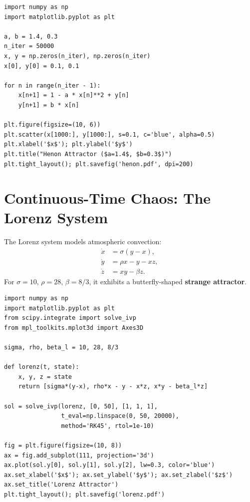 \begin{codeblock}[title=\textbf{H\'enon attractor}]
\begin{verbatim}
import numpy as np
import matplotlib.pyplot as plt

a, b = 1.4, 0.3
n_iter = 50000
x, y = np.zeros(n_iter), np.zeros(n_iter)
x[0], y[0] = 0.1, 0.1

for n in range(n_iter - 1):
    x[n+1] = 1 - a * x[n]**2 + y[n]
    y[n+1] = b * x[n]

plt.figure(figsize=(10, 6))
plt.scatter(x[1000:], y[1000:], s=0.1, c='blue', alpha=0.5)
plt.xlabel('$x$'); plt.ylabel('$y$')
plt.title("Henon Attractor ($a=1.4$, $b=0.3$)")
plt.tight_layout(); plt.savefig('henon.pdf', dpi=200)
\end{verbatim}
\end{codeblock}

\section{Continuous-Time Chaos: The Lorenz System}

\begin{definition}
The Lorenz system models atmospheric convection:
\begin{align}
  \dot{x} &= \sigma(y-x), \\
  \dot{y} &= \rho x - y - xz, \\
  \dot{z} &= xy - \beta z.
\end{align}
For $\sigma=10$, $\rho=28$, $\beta=8/3$, it exhibits a butterfly-shaped
\textbf{strange attractor}.
\end{definition}

\begin{codeblock}[title=\textbf{Lorenz attractor}]
\begin{verbatim}
import numpy as np
import matplotlib.pyplot as plt
from scipy.integrate import solve_ivp
from mpl_toolkits.mplot3d import Axes3D

sigma, rho, beta_l = 10, 28, 8/3

def lorenz(t, state):
    x, y, z = state
    return [sigma*(y-x), rho*x - y - x*z, x*y - beta_l*z]

sol = solve_ivp(lorenz, [0, 50], [1, 1, 1],
                t_eval=np.linspace(0, 50, 20000),
                method='RK45', rtol=1e-10)

fig = plt.figure(figsize=(10, 8))
ax = fig.add_subplot(111, projection='3d')
ax.plot(sol.y[0], sol.y[1], sol.y[2], lw=0.3, color='blue')
ax.set_xlabel('$x$'); ax.set_ylabel('$y$'); ax.set_zlabel('$z$')
ax.set_title('Lorenz Attractor')
plt.tight_layout(); plt.savefig('lorenz.pdf')
\end{verbatim}
\end{codeblock}

